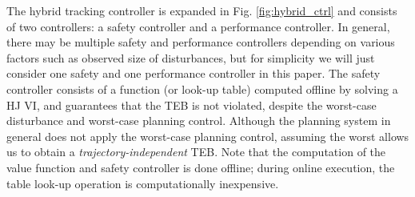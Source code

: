 


The hybrid tracking controller is expanded in Fig. \ref{fig:hybrid_ctrl} and consists of two controllers: a safety controller and a performance controller.
In general, there may be multiple safety and performance controllers depending on various factors such as observed size of disturbances, but for simplicity we will just consider one safety and one performance controller in this paper. 
The safety controller consists of a function (or look-up table) computed offline by solving a HJ VI, and guarantees that the TEB is not violated, despite the worst-case disturbance and worst-case planning control. 
Although the planning system in general does not apply the worst-case planning control, assuming the worst allows us to obtain a \textit{trajectory-independent} TEB.
Note that the computation of the value function and safety controller is done offline; during online execution, the table look-up operation is computationally inexpensive. 

